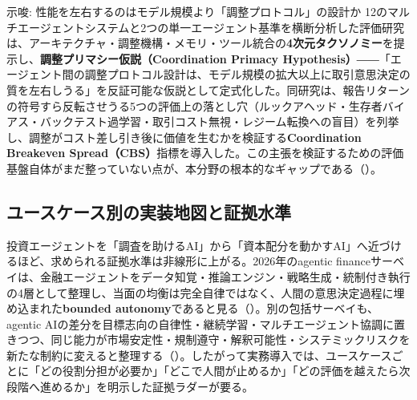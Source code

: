 \begin{insight}{示唆: 性能を左右するのはモデル規模より「調整プロトコル」の設計か}
12のマルチエージェントシステムと2つの単一エージェント基準を横断分析した評価研究は、アーキテクチャ・調整機構・メモリ・ツール統合の\textbf{4次元タクソノミー}を提示し、\textbf{調整プリマシー仮説（Coordination Primacy Hypothesis）}――「エージェント間の調整プロトコル設計は、モデル規模の拡大以上に取引意思決定の質を左右しうる」を反証可能な仮説として定式化した。同研究は、報告リターンの符号すら反転させうる5つの評価上の落とし穴（ルックアヘッド・生存者バイアス・バックテスト過学習・取引コスト無視・レジーム転換への盲目）を列挙し、調整がコスト差し引き後に価値を生むかを検証する\textbf{Coordination Breakeven Spread（CBS）}指標を導入した。この主張を検証するための評価基盤自体がまだ整っていない点が、本分野の根本的なギャップである（\cite{x04coordinationprimacy2026}）。
\end{insight}

\subsection{ユースケース別の実装地図と証拠水準}

投資エージェントを「調査を助けるAI」から「資本配分を動かすAI」へ近づけるほど、求められる証拠水準は非線形に上がる。2026年のagentic financeサーベイは、金融エージェントをデータ知覚・推論エンジン・戦略生成・統制付き執行の4層として整理し、当面の均衡は完全自律ではなく、人間の意思決定過程に埋め込まれた\textbf{bounded autonomy}であると見る（\cite{aiagentsfinmarkets2026}）。別の包括サーベイも、agentic AIの差分を目標志向の自律性・継続学習・マルチエージェント協調に置きつつ、同じ能力が市場安定性・規制遵守・解釈可能性・システミックリスクを新たな制約に変えると整理する（\cite{x04agenticaisurvey2026}）。したがって実務導入では、ユースケースごとに「どの役割分担が必要か」「どこで人間が止めるか」「どの評価を越えたら次段階へ進めるか」を明示した証拠ラダーが要る。

